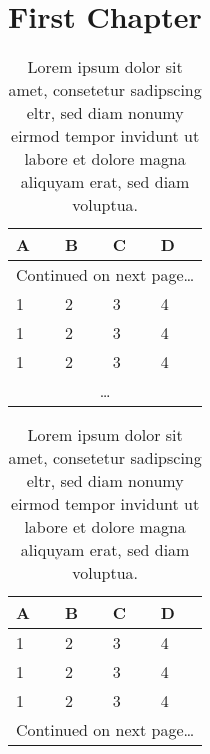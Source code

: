 \documentclass{scrbook}
\begin{document}

\chapter{First Chapter}
\begin{longtable}{|llll|}

\caption{Lorem ipsum dolor sit amet, consetetur sadipscing eltr, sed diam nonumy eirmod tempor invidunt ut labore et dolore magna aliquyam erat, sed diam voluptua.} \\

  \toprule
  \textbf{A} & \textbf{B} & \textbf{C} & \textbf{D} \\
  \midrule
\endhead

  \midrule
  \multicolumn{4}{r}{Continued on next page\ldots} \\
  \midrule
\endfoot

  \bottomrule
\endlastfoot

1 & 2 & 3 & 4 \\
1 & 2 & 3 & 4 \\
1 & 2 & 3 & 4 \\
\multicolumn{4}{|c|}{\ldots}\\
\end{longtable}

\begin{table}[!hb]
\centering
\caption{Lorem ipsum dolor sit amet, consetetur sadipscing eltr, sed diam nonumy eirmod tempor invidunt ut labore et dolore magna aliquyam erat, sed diam voluptua.}
\begin{tabular}{llll}
  \toprule
  \textbf{A} & \textbf{B} & \textbf{C} & \textbf{D} \\
  \midrule

1 & 2 & 3 & 4 \\
1 & 2 & 3 & 4 \\
1 & 2 & 3 & 4 \\

  \midrule
  \multicolumn{4}{r}{Continued on next page\ldots} \\
  \midrule

\end{tabular}
\end{table}
\end{document}
